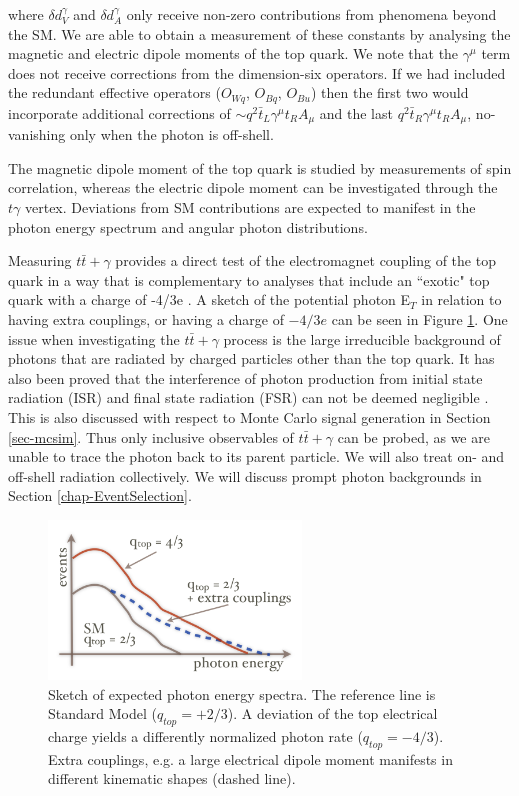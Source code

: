 where $\delta d^{\gamma}_V$ and $\delta d^{\gamma}_A$ only receive non-zero contributions from phenomena beyond the SM. We are able to obtain a measurement of these constants by analysing the magnetic and electric dipole moments of the top quark. We note that the $\gamma^{\mu}$ term does not receive corrections from the dimension-six operators. If we had included the redundant effective operators ($O_{Wq}$, $O_{Bq}$, $O_{Bu}$) then the first two would incorporate additional corrections of $\sim q^2 \bar{t}_L \gamma^{\mu} t_R A_{\mu}$ and the last $q^2 \bar{t}_R \gamma^{\mu} t_R A_{\mu}$, no-vanishing only when the photon is off-shell.

The magnetic dipole moment of the top quark is studied by measurements of spin correlation, whereas the electric dipole moment can be investigated through the $t\gamma$ vertex. Deviations from SM contributions are expected to manifest in the photon energy spectrum and angular photon distributions.

Measuring $t\bar{t}+\gamma$ provides a direct test of the electromagnet coupling of the top quark in a way that is complementary to analyses that include an ``exotic" top quark with a charge of -4/3e \cite{top-charge}. A sketch of the potential photon E$_T$ in relation to having extra couplings, or having a charge of $-4/3e$ can be seen in Figure \ref{fig-TopChargeSketch}. One issue when investigating the $t\bar{t}+\gamma$ process is the large irreducible background of photons that are radiated by charged particles other than the top quark. It has also been proved that the interference of photon production from initial state radiation (ISR) and final state radiation (FSR) can not be deemed negligible \cite{topchargemeasurement}. This is also discussed with respect to Monte Carlo signal generation in Section \ref{sec-mcsim}. Thus only inclusive observables of $t\bar{t}+\gamma$ can be probed, as we are unable to trace the photon back to its parent particle. We will also treat on- and off-shell radiation collectively. We will discuss prompt photon backgrounds in Section \ref{chap-EventSelection}. 

\begin{figure} \label{fig-TopChargeSketch}
\begin{center}
\includegraphics[width=0.6\textwidth]{Figures/TopChargeHeiner.png}
\caption{Sketch of expected photon energy spectra. The reference line is Standard Model ($q_{top} = +2/3$). A deviation of the top electrical charge yields a differently normalized photon rate ($q_{top} = −4/3$). Extra couplings, e.g. a large electrical dipole moment manifests in different kinematic shapes (dashed line). \cite{heinerthesis}}
\end{center}
\end{figure}


